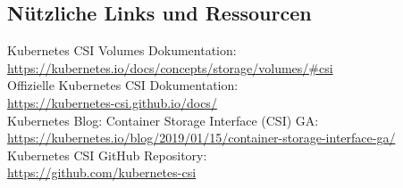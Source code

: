 \subsection{Nützliche Links und Ressourcen}
Kubernetes CSI Volumes Dokumentation:\\
\url{https://kubernetes.io/docs/concepts/storage/volumes/#csi}\\
Offizielle Kubernetes CSI Dokumentation:\\
\url{https://kubernetes-csi.github.io/docs/}\\
Kubernetes Blog: Container Storage Interface (CSI) GA:\\  
\url{https://kubernetes.io/blog/2019/01/15/container-storage-interface-ga/}\\
Kubernetes CSI GitHub Repository:\\
\url{https://github.com/kubernetes-csi}\\